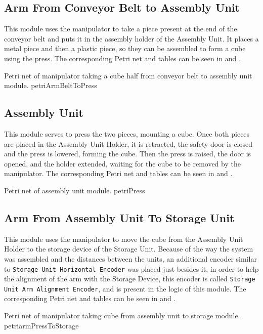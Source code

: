\subsection{Arm From Conveyor Belt to Assembly Unit}
This module uses the manipulator to take a piece present at the end of the
conveyor belt and puts it in the assembly holder of the Assembly Unit. It places
a metal piece
and then a plastic piece, so they can be assembled to form a cube using the press.
The corresponding Petri net and tables can be seen in
 and .


{Petri net of manipulator taking a cube half from conveyor belt to assembly unit
  module.}
{petriArmBeltToPress}
\subsection{Assembly Unit}
This module serves to press the two pieces, mounting a cube. Once both pieces
are placed in the Assembly Unit Holder, it is retracted, the safety door is
closed and the press is lowered, forming the cube. Then the press is raised, the
door is opened, and the holder extended, waiting for the cube to be removed by
the manipulator.
The corresponding Petri net and tables can be seen in
 and .



{Petri net of assembly unit module.}
{petriPress}
\subsection{Arm From Assembly Unit To Storage Unit}
This module uses the manipulator to move the cube from the Assembly Unit Holder
to the storage device of the Storage Unit. Because of the way the system was
assembled and the distances between the units, an additional encoder similar to \newline
\verb|Storage Unit Horizontal Encoder| was placed just besides it, in order to
help the alignment of the arm with the Storage Device, this encoder is called \newline
\verb|Storage Unit Arm Alignment Encoder|, and is present in the logic of this module.
The corresponding Petri net and tables can be seen in
 and .


{Petri net of manipulator taking cube from assembly unit to storage module.}
{petriarmPressToStorage}
